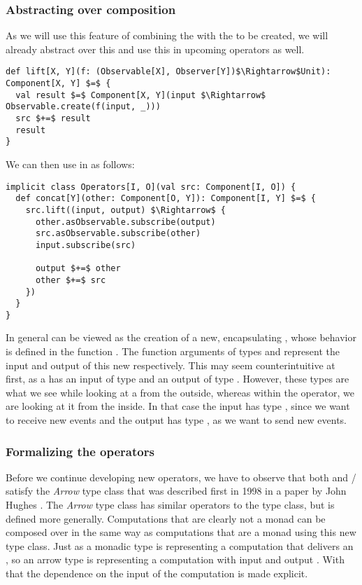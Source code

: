 \subsubsection{Abstracting over composition}
As we will use this feature of combining the \subs with the \comp to be created, we will already abstract over this and use this in upcoming operators as well.

\begin{lstlisting}[style=InlineScalaStyle]
def lift[X, Y](f: (Observable[X], Observer[Y])$\Rightarrow$Unit): Component[X, Y] $=$ {
  val result $=$ Component[X, Y](input $\Rightarrow$ Observable.create(f(input, _)))
  src $+=$ result
  result
}
\end{lstlisting}

We can then use  in  as follows:

\begin{lstlisting}[style=InlineScalaStyle]
implicit class Operators[I, O](val src: Component[I, O]) {
  def concat[Y](other: Component[O, Y]): Component[I, Y] $=$ {
    src.lift((input, output) $\Rightarrow$ {
      other.asObservable.subscribe(output)
      src.asObservable.subscribe(other)
      input.subscribe(src)

      output $+=$ other
      other $+=$ src
    })
  }
}
\end{lstlisting}

In general  can be viewed as the creation of a new, encapsulating \comp, whose behavior is defined in the function . The function arguments of types \obs and \obv represent the input and output of this new \comp respectively. This may seem counterintuitive at first, as a \comp has an input of type \obv and an output of type \obs. However, these types are what we see while looking at a \comp from the outside, whereas within the  operator, we are looking at it from the inside. In that case the input has type \obs, since we want to receive new events and the output has type \obv, as we want to send new events.

\subsubsection{Formalizing the operators}
Before we continue developing new operators, we have to observe that both  and / satisfy the \textit{Arrow} type class that was described first in 1998 in a paper by John Hughes . The \textit{Arrow}  type class has similar operators to the  type class, but is defined more generally. Computations that are clearly not a monad can be composed over in the same way as computations that are a monad using this new type class. Just as a monadic type  is representing a computation that delivers an , so an arrow type  is representing a computation with input  and output . With that the dependence on the input of the computation is made explicit.

